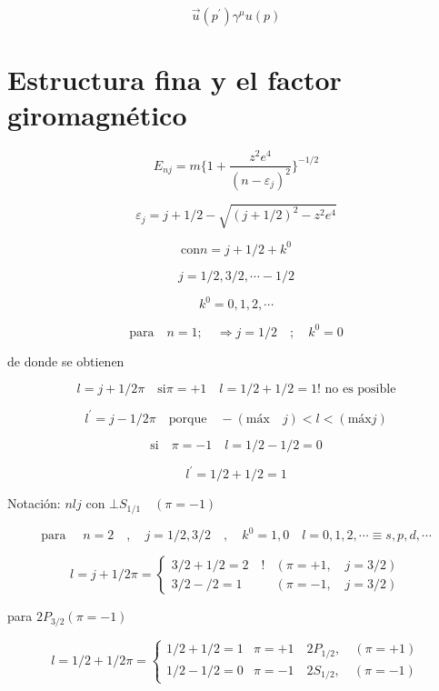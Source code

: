 \documentclass{report}
\begin{document}
\[\overrightarrow{u}(p^{\prime}) \gamma^{\mu}u (p)\]



\chapter{Estructura fina y el factor giromagnético}


\begin{equation}
E_{nj}= m \lbrace 1 + \frac{z^2 e^4 }{(n- \varepsilon _{j})^2 }\rbrace ^{-1/2}
\end{equation}

\[\varepsilon _{j} = j + 1/2 - \sqrt{(j+1/2)^2 - z^2 e^4} \]

\[\text{con} n = j + 1/2 + k^0 \]

\[j = 1/2 , 3/2, \cdots -1/2 \]

\[k^0 = 0,1,2, \cdots \]

\[\text{para} \quad n = 1 ; \quad \Rightarrow j =1/2 \quad ; \quad k^0 = 0 \]

de donde se obtienen 

\[l= j+1/2 \pi \quad \text{si} \pi = + 1 \quad l = 1/2 + 1/2 = 1 \text{! no es posible} \]

\[l^{\prime} = j -1/2 \pi \quad \text{porque} \quad  -(\text{máx} \quad j)<l<(\text{máx}j) \]

\[\text{si} \quad \pi= -1 \quad l =1/2 - 1/2 = 0\]

\[l^{\prime} = 1/2 + 1/2 = 1\]

Notación: $nlj$ con $\bot S_{1/1} \quad (\pi = -1)$

\[\text{para } \quad n = 2 \quad , \quad j = 1/2,3/2 \quad , \quad k^0 = 1,0 \quad l = 0,1,2,\cdots \equiv s,p,d,\cdots\]

\[l = j +1/2 \pi  = \begin{cases} 3/2+1/2 = 2 \quad ! & (\pi = +1, \quad j = 3/2) \\

3/2-/2 = 1 \quad  & (\pi = -1 , \quad j = 3/2)  \end{cases}\]

para $2 P_{3/2}(\pi= -1)$

\[l = 1/2 +1/2 \pi  = \begin{cases} 1/2+1/2 = 1  & \pi = + 1 \quad  2 P_{1/2}, \quad (\pi= +1) \\

1/2-1/2 = 0  & \pi = - 1 \quad  2 S_{1/2}, \quad (\pi= -1)  \end{cases}\]
\end{document}
